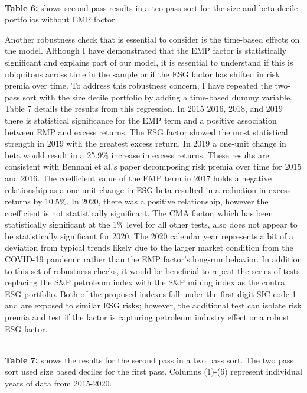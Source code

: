  \begin{center}
    \paperspacingnarrow
    \\
    \textbf{Table 6:} shows  second pass results in a teo pass sort for the size and beta decile portfolios without EMP factor\\
    \paperspacingwide
\end{center}
Another robustness check that is essential to consider is the time-based effects on the model. Although I have demonstrated that the EMP factor is statistically significant and explains part of our model, it is essential to understand if this is ubiquitous across time in the sample or if the  ESG factor has shifted in risk premia over time. To address this robustness concern, I have repeated the two-pass sort with the size decile portfolio by adding a time-based dummy variable. Table 7 details the results from this regression. In 2015 2016, 2018, and 2019 there is statistical significance for the EMP term and a positive association between EMP and excess returns. The ESG factor showed the most statistical strength in 2019 with the greatest excess return. In 2019 a one-unit change in beta would result in a 25.9\% increase in excess returns. These results are consistent with Bennani et al.'s paper decomposing risk premia over time for 2015 and 2016. The coefficient value of the EMP term in 2017  holds a negative relationship as a one-unit change in ESG beta resulted in a reduction in excess returns by 10.5\%. In 2020, there was a positive relationship, however the coefficient is not statistically significant. The CMA factor, which has been statistically significant at the 1\% level for all other tests, also does not appear to be statistically significant for 2020. The 2020 calendar year represents a bit of a deviation from typical trends likely due to the larger market condition from the COVID-19 pandemic rather than the EMP factor's long-run behavior. In addition to this set of robustness checks, it would be beneficial to repeat the series of tests replacing the S\&P petroleum index with the S\&P mining index as the contra ESG portfolio. Both of the proposed indexes fall under the first digit  SIC code 1  and are exposed to similar ESG risks; however, the additional test can isolate risk premia and test if the factor is capturing petroleum industry effect or a robust ESG factor.  


\begin{center}
    \paperspacingnarrow
    \\
    \textbf{Table 7:} shows the results for the second pass in a two pass sort. The two pass sort used size based deciles for the first pass. Columns (1)-(6) represent individual years of data from 2015-2020. 
    \paperspacingwide
\end{center}

